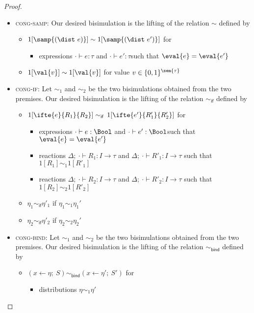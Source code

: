 \begin{proof}
\begin{itemize}
\begin{itemize}
\end{itemize}
\item \textsc{cong-samp}: Our desired bisimulation is the lifting of the relation $\sim$ defined by
\begin{itemize}
\item $1[\samp{(\dist \ e)}] \sim 1[\samp{(\dist \ e')}]$ for
\begin{itemize}
\item expressions $\cdot \vdash e : \tau$ and $\cdot \vdash e' : \tau$such that $\eval{e} = \eval{e'}$
\end{itemize}
\item $1[\val{v}] \sim 1[\val{v}]$ for value $v \in \{0,1\}^{\sem{\tau}}$
\end{itemize}
\item \textsc{cong-if}: Let $\sim_1$ and $\sim_2$ be the two bisimulations obtained from the two premises. Our desired bisimulation is the lifting of the relation $\sim_\mathsf{if}$ defined by
\begin{itemize}
\item $1[\ifte{e}{R_1}{R_2}] \sim_\mathsf{if} \, 1[\ifte{e'}{R'_1}{R'_2}]$ for 
\begin{itemize}
\item expressions $\cdot \vdash e : \Bool$ and $\cdot \vdash e' : \Bool $such that $\eval{e} = \eval{e'}$
\item reactions $\Delta; \ \cdot \vdash R_1 : I \to \tau$ and $\Delta; \ \cdot \vdash R'_1 : I \to \tau$ such that $1[R_1] \sim_1 1[R'_1]$
\item reactions $\Delta; \ \cdot \vdash R_2 : I \to \tau$ and $\Delta; \ \cdot \vdash R'_2 : I \to \tau$ such that $1[R_2] \sim_2 1[R'_2]$
\end{itemize}
\item $\eta_1 \sim_\mathsf{if} \eta'_1$ if $\eta_1 \sim_1 \eta_1'$
\item $\eta_2 \sim_\mathsf{if} \eta'_2$ if $\eta_2 \sim_2 \eta_2'$
\end{itemize}
\item \textsc{cong-bind}: Let $\sim_1$ and $\sim_2$ be the two bisimulations obtained from the two premises. Our desired bisimulation is the lifting of the relation $\sim_\mathsf{bind}$ defined by
\begin{itemize}
\item $(x \leftarrow \eta; \ S) \sim_\mathsf{bind} (x \leftarrow \eta'; \ S')$ for
\begin{itemize}
\item distributions $\eta \sim_1 \eta'$

\end{itemize}
\end{itemize}
\end{itemize}
\end{proof}
